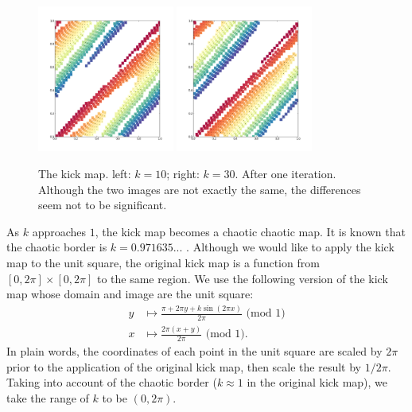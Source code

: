 \documentclass[12pt]{reedmcm}
\begin{document}
\begin{figure}[h!]
  \centering
  \includegraphics[width=0.4\textwidth]{kickmap_2pi}
  \hspace{2cm}
  \includegraphics[width=0.4\textwidth]{kickmap_3pi}
  \caption{The kick map. left: $k=10$; right: $k = 30$. After one iteration. 
    Although the two images are not exactly the same, the differences seem not to be significant.
  }
  \label{fig:kickmap_demo2}
\end{figure}
%
As $k$ approaches $1$, the kick map becomes a chaotic chaotic map.
It is known that the chaotic border is $k = 0.971635...$ \citep{spedia}.
Although we would like to apply the kick map to the unit square, the original kick map is a function from $[0,2\pi] \times [0,2\pi]$ to the same region.
We use the following version of the kick map whose domain and image are the unit square:
\begin{align*}
  y &\mapsto \frac{\pi + 2\pi y + k \sin (2\pi x)}{2\pi} \mbox{ (mod 1)}\\
  x &\mapsto \frac{2\pi (x + y)}{2\pi} \mbox{ (mod 1)}.
\end{align*}
In plain words, the coordinates of each point in the unit square are scaled by $2\pi$ prior to the application of the original kick map, then scale the result by $1/2\pi$.
Taking into account of the chaotic border ($k\approx 1$ in the original kick map), we take the range of $k$ to be $(0,2\pi)$.
\end{document}
